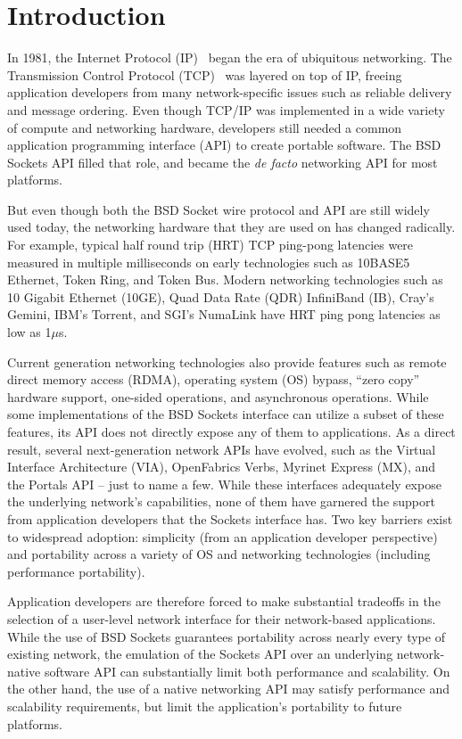 \section{Introduction}
\label{sec:introduction}


In 1981, the Internet Protocol (IP)~\cite{RFC791} began the era of
ubiquitous networking.  The Transmission Control Protocol
(TCP)~\cite{RFC793} was layered on top of IP, freeing application
developers from many network-specific issues such as reliable delivery
and message ordering.  Even though TCP/IP was implemented in a wide
variety of compute and networking hardware, developers still needed a
common application programming interface (API) to create portable software.
%
The BSD Sockets API filled that role, and became the {\em de facto}
networking API for most platforms.  

But even though both the BSD Socket wire protocol and API are still
widely used today, the networking hardware that they are used on has
changed radically.
%
For example, typical half round trip (HRT) TCP ping-pong latencies
were measured in multiple milliseconds on early technologies such as
10BASE5 Ethernet, Token Ring, and Token Bus.
%
Modern networking technologies such as 10 Gigabit Ethernet (10GE), Quad Data Rate
(QDR) InfiniBand (IB), Cray's Gemini, IBM's Torrent, 
and SGI's NumaLink have HRT ping pong latencies as low as 
1$\mu$s.

Current generation networking technologies also provide features such
as remote direct memory access (RDMA), operating system (OS) bypass,
``zero copy'' hardware support, one-sided operations, and asynchronous
operations.
%
While some implementations of the BSD Sockets interface can utilize a
subset of these features, its API does not directly expose any of them
to applications.
%
As a direct result, several next-generation network APIs have evolved,
such as the Virtual Interface Architecture (VIA), OpenFabrics Verbs,
Myrinet Express (MX), and the Portals API -- just to name a few.
%
While these interfaces adequately expose the underlying network's
capabilities, none of them have garnered the support from application
developers that the Sockets interface has.
%
Two key barriers exist to widespread adoption: simplicity (from an
application developer perspective) and portability across a variety of
OS and networking technologies (including performance portability).

Application developers are therefore forced to make substantial
tradeoffs in the selection of a user-level network interface for their
network-based applications.
%
While the use of BSD Sockets guarantees portability across nearly
every type of existing network, the emulation of the Sockets API over
an underlying network-native software API can substantially limit both
performance and scalability.
%
On the other hand, the use of a native networking API may satisfy
performance and scalability requirements, but limit the application's
portability to future platforms.

